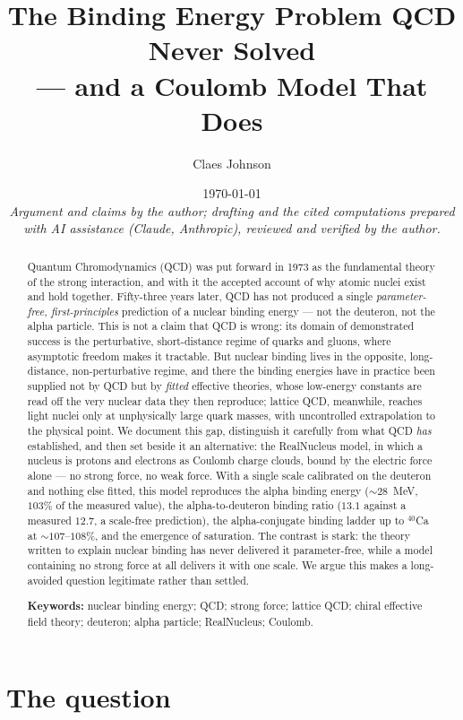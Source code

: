 \documentclass[11pt]{article}
\title{The Binding Energy Problem QCD Never Solved\\ --- and a Coulomb Model That Does}
\author[1]{Claes Johnson}
\affil[1]{KTH Royal Institute of Technology, SE-100 44 Stockholm, Sweden \\
\texttt{claesjohnson@gmail.com}}
\date{\today \\[0.4em]
\small\textit{Argument and claims by the author; drafting and the cited computations prepared with AI assistance (Claude, Anthropic), reviewed and verified by the author.}}
\begin{document}
\maketitle

\begin{abstract}
Quantum Chromodynamics (QCD) was put forward in 1973 as the fundamental theory of the strong
interaction, and with it the accepted account of why atomic nuclei exist and hold together. Fifty-three
years later, QCD has not produced a single \emph{parameter-free, first-principles} prediction of a
nuclear binding energy --- not the deuteron, not the alpha particle. This is not a claim that QCD is
wrong: its domain of demonstrated success is the perturbative, short-distance regime of quarks and
gluons, where asymptotic freedom makes it tractable. But nuclear binding lives in the opposite,
long-distance, non-perturbative regime, and there the binding energies have in practice been supplied not
by QCD but by \emph{fitted} effective theories, whose low-energy constants are read off the very nuclear
data they then reproduce; lattice QCD, meanwhile, reaches light nuclei only at unphysically large quark
masses, with uncontrolled extrapolation to the physical point. We document this gap, distinguish it
carefully from what QCD \emph{has} established, and then set beside it an alternative: the RealNucleus
model, in which a nucleus is protons and electrons as Coulomb charge clouds, bound by the electric force
alone --- no strong force, no weak force. With a single scale calibrated on the deuteron and nothing else
fitted, this model reproduces the alpha binding energy ($\sim 28$~MeV, $103\%$ of the measured value), the
alpha-to-deuteron binding ratio ($13.1$ against a measured $12.7$, a scale-free prediction), the
alpha-conjugate binding ladder up to ${}^{40}$Ca at $\sim 107$--$108\%$, and the emergence of saturation. The contrast is stark: the theory
written to explain nuclear binding has never delivered it parameter-free, while a model containing no
strong force at all delivers it with one scale. We argue this makes a long-avoided question legitimate
rather than settled.

\medskip
\noindent\textbf{Keywords:} nuclear binding energy; QCD; strong force; lattice QCD; chiral effective
field theory; deuteron; alpha particle; RealNucleus; Coulomb.
\end{abstract}

\doublespacing

\section{The question}
\label{sec:question}
\end{document}
